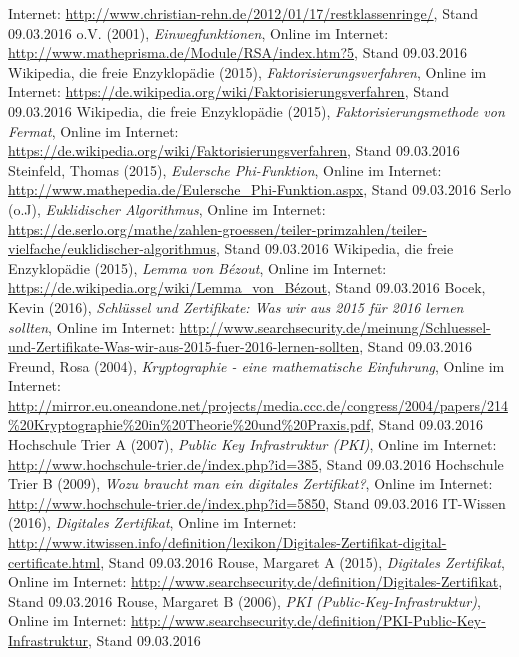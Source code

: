 \documentclass[a4paper, fontsize=12pt, parskip=full, toc=bibliographynumbered]{scrreprt}
\begin{document}
\begin{thebibliography}{9}
  Internet: \url{http://www.christian-rehn.de/2012/01/17/restklassenringe/}, Stand 09.03.2016
 o.V. (2001), \emph{Einwegfunktionen}, Online im Internet: \url{http://www.matheprisma.de/Module/RSA/index.htm?5}, Stand 09.03.2016
 Wikipedia, die freie Enzyklopädie (2015), \emph{Faktorisierungsverfahren}, Online im Internet: \url{https://de.wikipedia.org/wiki/Faktorisierungsverfahren}, Stand 09.03.2016
 Wikipedia, die freie Enzyklopädie (2015), \emph{Faktorisierungsmethode von Fermat}, Online im Internet: \url{https://de.wikipedia.org/wiki/Faktorisierungsverfahren}, Stand 09.03.2016
 Steinfeld, Thomas (2015), \emph{Eulersche Phi-Funktion}, Online im Internet: \url{http://www.mathepedia.de/Eulersche_Phi-Funktion.aspx}, Stand 09.03.2016
 Serlo (o.J), \emph{Euklidischer Algorithmus}, Online im Internet: \url{https://de.serlo.org/mathe/zahlen-groessen/teiler-primzahlen/teiler-vielfache/euklidischer-algorithmus}, Stand 09.03.2016
 Wikipedia, die freie Enzyklopädie (2015), \emph{Lemma von Bézout}, Online im Internet: \url{https://de.wikipedia.org/wiki/Lemma_von_Bézout}, Stand 09.03.2016
 Bocek, Kevin (2016), \emph{Schlüssel und Zertifikate: Was wir aus 2015 für 2016 lernen sollten}, Online im Internet: \url{http://www.searchsecurity.de/meinung/Schluessel-und-Zertifikate-Was-wir-aus-2015-fuer-2016-lernen-sollten}, Stand 09.03.2016
 Freund, Rosa (2004), \emph{Kryptographie - eine mathematische Einfuhrung}, Online im Internet: \url{http://mirror.eu.oneandone.net/projects/media.ccc.de/congress/2004/papers/214\%20Kryptographie\%20in\%20Theorie\%20und\%20Praxis.pdf}, Stand 09.03.2016
 Hochschule Trier A (2007), \emph{Public Key Infrastruktur (PKI)}, Online im Internet: \url{http://www.hochschule-trier.de/index.php?id=385}, Stand 09.03.2016
 Hochschule Trier B (2009), \emph{Wozu braucht man ein digitales Zertifikat?}, Online im Internet: \url{http://www.hochschule-trier.de/index.php?id=5850}, Stand 09.03.2016
 IT-Wissen (2016), \emph{Digitales Zertifikat}, Online im Internet: \url{http://www.itwissen.info/definition/lexikon/Digitales-Zertifikat-digital-certificate.html}, Stand 09.03.2016
 Rouse, Margaret A (2015), \emph{Digitales Zertifikat}, Online im Internet: \url{http://www.searchsecurity.de/definition/Digitales-Zertifikat}, Stand 09.03.2016
 Rouse, Margaret B (2006), \emph{PKI (Public-Key-Infrastruktur)}, Online im Internet: \url{http://www.searchsecurity.de/definition/PKI-Public-Key-Infrastruktur}, Stand 09.03.2016

\end{thebibliography}
\end{document}
